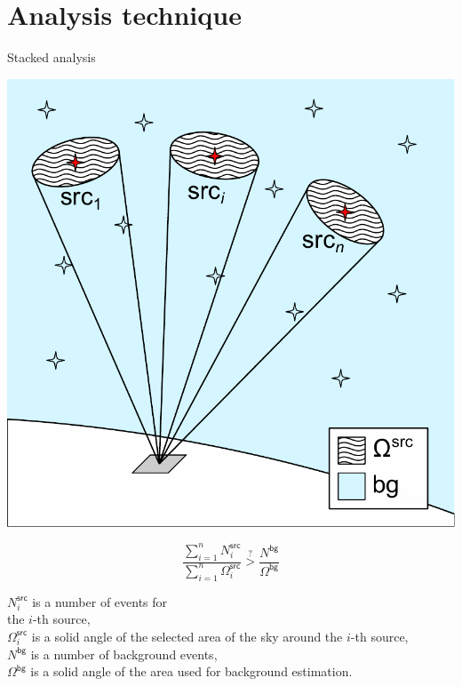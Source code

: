 \section{Analysis technique}

\begin{frame}{Stacked analysis}
\begin{minipage}[c]{0.45\textwidth}
  \includegraphics[width=1\textwidth]{pics/stacked.pdf}
\end{minipage}
\hfill
\begin{minipage}[c]{0.52\textwidth}
{
\Large
\[
\frac{\sum_{i=1}^n N_i^\mathsf{src}}{\sum_{i=1}^n \Omega_i^\mathsf{src}} \stackrel{?}{>}
\frac{N^\mathsf{bg}}{\Omega^\mathsf{bg}}
\]
}
\small

\textcolor{kit-green100}{$N_i^\mathsf{src}$} is a number of events for \\the \textcolor{kit-green100}{$i$}-th source,\\
\textcolor{kit-green100}{$\Omega_i^\mathsf{src}$} is a solid angle of the selected area of the sky around the \textcolor{kit-green100}{$i$}-th source,\\
\textcolor{kit-green100}{$N^\mathsf{bg}$} is a number of background events,\\
\textcolor{kit-green100}{$\Omega^\mathsf{bg}$} is a solid angle of the area used for background estimation.

\end{minipage}
\end{frame}


